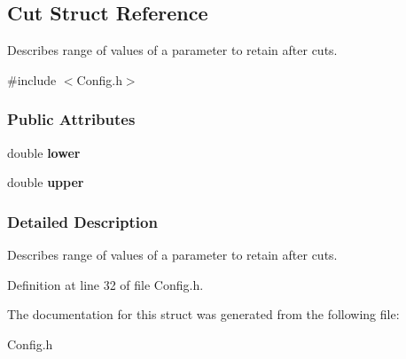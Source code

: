 \hypertarget{structCut}{
\subsection{Cut Struct Reference}
\label{structCut}
}


Describes range of values of a parameter to retain after cuts.  




{\ttfamily \#include $<$Config.h$>$}

\subsubsection*{Public Attributes}
\begin{DoxyCompactItemize}
\item 
\hypertarget{structCut_aa0560d0308b923448e508724147f69d8}{
double {\bfseries lower}}
\label{structCut_aa0560d0308b923448e508724147f69d8}

\item 
\hypertarget{structCut_a2ef70208b9fe13cf032fcc258514ed18}{
double {\bfseries upper}}
\label{structCut_a2ef70208b9fe13cf032fcc258514ed18}

\end{DoxyCompactItemize}


\subsubsection{Detailed Description}
Describes range of values of a parameter to retain after cuts. 

Definition at line 32 of file Config.h.



The documentation for this struct was generated from the following file:\begin{DoxyCompactItemize}
\item 
Config.h\end{DoxyCompactItemize}
